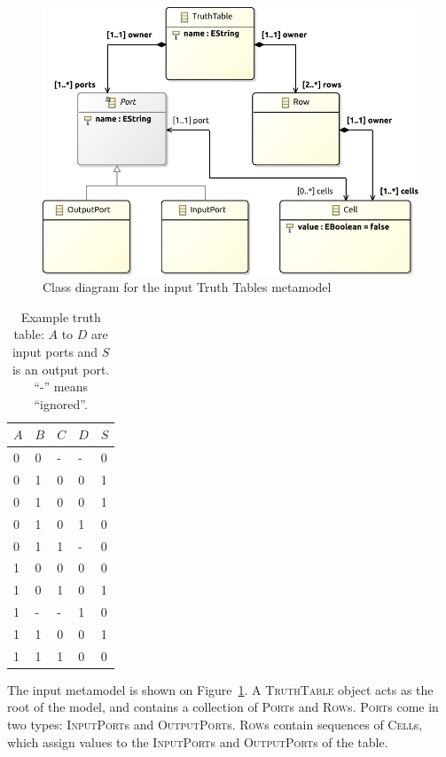 \documentclass[a4paper]{scrartcl}
\newcommand*{\class}[1]{\textsc{#1}}
\begin{document}
\begin{figure}
  \centering
  \includegraphics[width=.9\textwidth]{tt}
  \caption{Class diagram for the input Truth Tables metamodel}
  \label{fig:tt-metamodel}
\end{figure}

\begin{table}
  \centering
  \begin{tabular}{llll|l}
    $A$ & $B$ & $C$ & $D$ & $S$ \\
    \hline
    0 & 0 & - & - & 0 \\
    0 & 1 & 0 & 0 & 1 \\
    0 & 1 & 0 & 0 & 1 \\
    0 & 1 & 0 & 1 & 0 \\
    0 & 1 & 1 & - & 0 \\
    1 & 0 & 0 & 0 & 0 \\
    1 & 0 & 1 & 0 & 1 \\
    1 & - & - & 1 & 0 \\
    1 & 1 & 0 & 0 & 1 \\
    1 & 1 & 1 & 0 & 0 \\
  \end{tabular}
  \caption{Example truth table: $A$ to $D$ are input ports and $S$ is an output port. ``-'' means ``ignored''.}
  \label{tab:tt-example}
\end{table}

The input metamodel is shown on Figure~\ref{fig:tt-metamodel}. A
\class{Truth\-Table} object acts as the root of the model, and contains a
collection of \class{Port}s and \class{Row}s. \class{Port}s come in two types:
\class{Input\-Port}s and \class{Output\-Port}s. \class{Row}s contain sequences
of \class{Cell}s, which assign values to the \class{Input\-Port}s and
\class{Output\-Port}s of the table.
\end{document}

